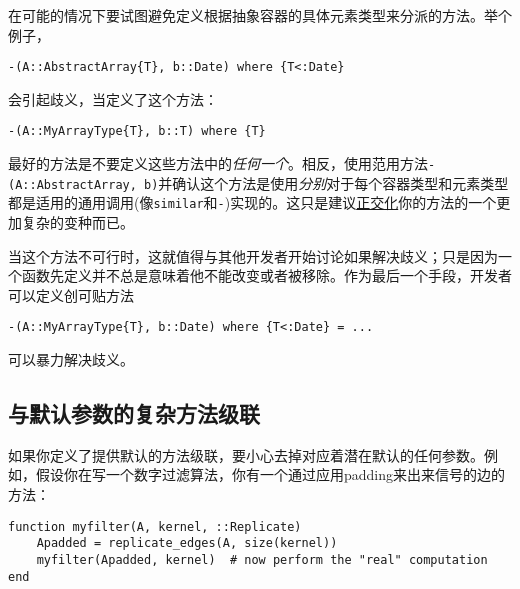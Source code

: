在可能的情况下要试图避免定义根据抽象容器的具体元素类型来分派的方法。举个例子，




\begin{verbatim}
-(A::AbstractArray{T}, b::Date) where {T<:Date}
\end{verbatim}



会引起歧义，当定义了这个方法：




\begin{verbatim}
-(A::MyArrayType{T}, b::T) where {T}
\end{verbatim}



最好的方法是不要定义这些方法中的\emph{任何一个}。相反，使用范用方法\texttt{-(A::AbstractArray, b)}并确认这个方法是使用\emph{分别}对于每个容器类型和元素类型都是适用的通用调用(像\texttt{similar}和\texttt{-})实现的。这只是建议\hyperlink{1356336112225694303}{正交化}你的方法的一个更加复杂的变种而已。



当这个方法不可行时，这就值得与其他开发者开始讨论如果解决歧义；只是因为一个函数先定义并不总是意味着他不能改变或者被移除。作为最后一个手段，开发者可以定义{\textquotedbl}创可贴{\textquotedbl}方法




\begin{verbatim}
-(A::MyArrayType{T}, b::Date) where {T<:Date} = ...
\end{verbatim}



可以暴力解决歧义。



\hypertarget{5733743229509139145}{}


\subsection{与默认参数的复杂方法{\textquotedbl}级联{\textquotedbl}}



如果你定义了提供默认的方法{\textquotedbl}级联{\textquotedbl}，要小心去掉对应着潜在默认的任何参数。例如，假设你在写一个数字过滤算法，你有一个通过应用padding来出来信号的边的方法：




\begin{verbatim}
function myfilter(A, kernel, ::Replicate)
    Apadded = replicate_edges(A, size(kernel))
    myfilter(Apadded, kernel)  # now perform the "real" computation
end
\end{verbatim}



